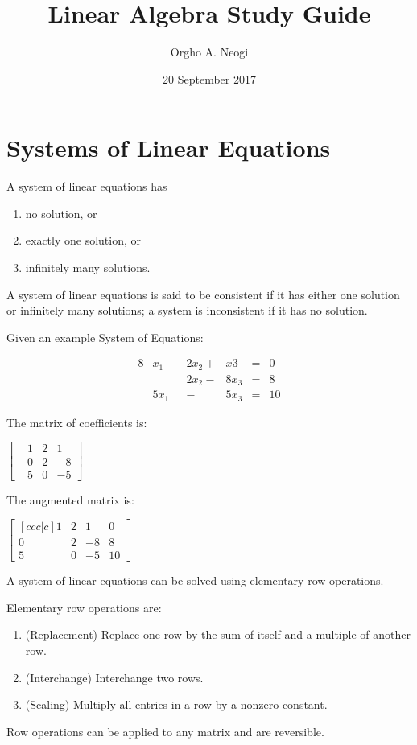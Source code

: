 \documentclass[oneside]{report}
\title{Linear Algebra Study Guide}
\author{Orgho A. Neogi}
\date{20 September 2017}
\begin{document}
\maketitle

\section{Systems of Linear Equations}

A system of linear equations has

\begin{enumerate}
  \item no solution, or
  \item exactly one solution, or
  \item infinitely many solutions.
\end{enumerate}

A system of linear equations is said to be consistent if it has either one solution or
infinitely many solutions; a system is inconsistent if it has no solution.

Given an example System of Equations:

\begin{alignat}{8}
  &x_1 - &2x_2 + &x3  &= &0 \\
  &     &2x_2 - &8x_3 &= &8 \\
  &5x_1 &     - &5x_3 &= &10
\end{alignat}

The matrix of coefficients is:

\begin{center}
$\begin{bmatrix}
  &1 &2 &1\\
  &0 &2 &-8\\
  &5 &0 &-5
\end{bmatrix}$
\end{center}

The augmented matrix is:
\begin{center}
  $\begin{bmatrix}[ccc|c]
    1 &2 &1  &0\\
    0 &2 &-8 &8\\
    5 &0 &-5 &10
  \end{bmatrix}$
\end{center}

A system of linear equations can be solved using elementary row operations.

Elementary row operations are:
\begin{enumerate}
  \item (Replacement) Replace one row by the sum of itself and a multiple of another row.
  \item (Interchange) Interchange two rows.
  \item (Scaling) Multiply all entries in a row by a nonzero constant.
\end{enumerate}

Row operations can be applied to any matrix and are reversible.
\end{document}
